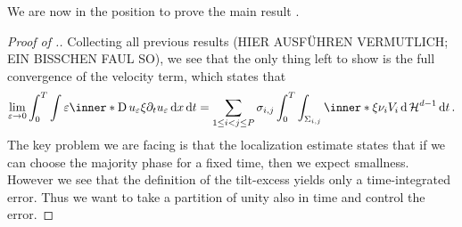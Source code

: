 We are now in the position to prove the main result 
.

\begin{proof}[Proof of .]
	Collecting all previous results (HIER AUSFÜHREN VERMUTLICH; EIN BISSCHEN 
	FAUL SO), we see that the only thing left to show is the full convergence 
	of the velocity term, which states that
	\begin{equation*}
		\lim_{ \varepsilon \to 0 }
			\int_{ 0 }^{ T }
				\int
					\varepsilon
					\inner*{ \diff u_{ \varepsilon } \xi }{ \partial_{ t } u_{ 
					\varepsilon } }
				\dd{ x }
			\dd{ t }
		=
		\sum_{ 1 \leq i < j \leq P }
			\sigma_{ i , j }
			\int_{ 0 }^{ T }
				\int_{ \Sigma_{ i , j } }
					\inner*{ \xi }{ \nu_{ i } }
					V_{ i }
				\dd{ \hm^{ d - 1 } }
			\dd{ t }.
	\end{equation*} 
	The key problem we are facing is that the localization estimate 
	 states that if we can choose the 
	majority phase for a fixed time, then we expect smallness. However we see 
	that the definition of the tilt-excess yields only a time-integrated error. 
	Thus we want to take a partition of unity also in time and control the 
	error.
	

\end{proof}
